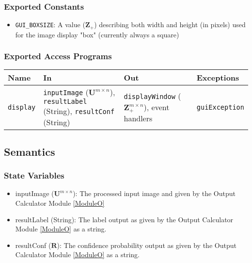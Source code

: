 \documentclass[12pt, titlepage]{article}
\def\code#1{\texttt{#1}}
\begin{document}
\subsubsection{Exported Constants}

\begin{itemize}
  \item \code{GUI\_BOXSIZE}: A value ($\mathbf{Z}_{+}$) describing both width and height (in pixels) used for the image
  display "box" (currently always a square)
\end{itemize}

\subsubsection{Exported Access Programs}

\begin{center}
\begin{tabular}{p{2cm} p{4cm} p{4cm} p{2cm}}
\hline
\textbf{Name} & \textbf{In} & \textbf{Out} & \textbf{Exceptions} \\
\hline
\code{display} & \code{inputImage} ($\mathbf{U}^{m \times n}$), \code{resultLabel} (String), \code{resultConf} (String) & \code{displayWindow} ($\mathbf{Z}_{+}^{m \times n}$), event handlers & \code{guiException} \\
\hline
\end{tabular}
\end{center}

\subsection{Semantics}

\subsubsection{State Variables}

\begin{itemize}
  \item inputImage ($\mathbf{U}^{m \times n}$): The processed input image and given by the Output Calculator Module \ref{ModuleO}
  \item resultLabel (String): The label output as given by the Output Calculator Module \ref{ModuleO} as a string.
  \item resultConf ($\mathbf{R}$): The confidence probability output as given by the Output Calculator Module \ref{ModuleO} as a string.
\end{itemize}
\end{document}
